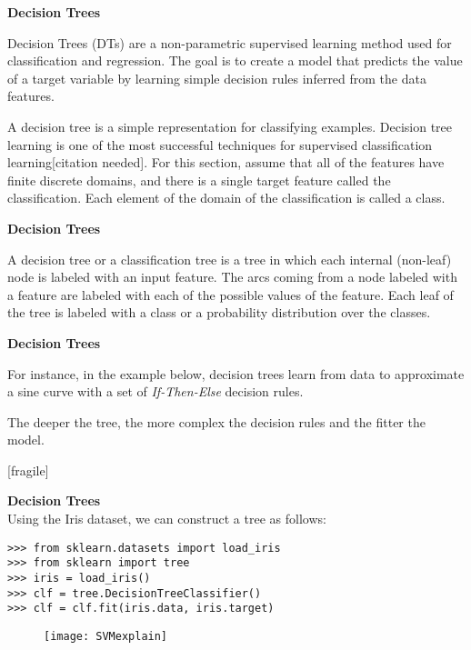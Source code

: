 \documentclass[MASTER.tex]{subfiles}
\begin{document}
 

 
  
\textbf{Decision Trees}
 
   Decision Trees (DTs) are a non-parametric supervised learning method used for classification and regression.  The goal is to create a model that predicts the value of a target variable by learning simple decision rules inferred from the data features.
 
 

 
 A decision tree is a simple representation for classifying examples. Decision tree learning is one of the most successful techniques for supervised classification learning[citation needed]. For this section, assume that all of the features have finite discrete domains, and there is a single target feature called the classification. Each element of the domain of the classification is called a class. 
 
 
  
 \textbf{Decision Trees}
  
   A decision tree or a classification tree is a tree in which each internal (non-leaf) node is labeled with an input feature. 
   The arcs coming from a node labeled with a feature are labeled with each of the possible values of the feature.
   Each leaf of the tree is labeled with a class or a probability distribution over the classes.

 
 
 
  
\textbf{Decision Trees}
 
\item For instance, in the example below, decision trees learn from data to approximate a sine curve with a set of \textit{If-Then-Else} decision rules. 
\item The deeper the tree, the more complex the decision rules and the fitter the model.
 

 
 [fragile]
  
\textbf{Decision Trees}\\

Using the Iris dataset, we can construct a tree as follows:
{
\normalsize
\begin{framed}
\begin{verbatim}
>>> from sklearn.datasets import load_iris
>>> from sklearn import tree
>>> iris = load_iris()
>>> clf = tree.DecisionTreeClassifier()
>>> clf = clf.fit(iris.data, iris.target)
\end{verbatim}
\end{framed}
}
 

 

\begin{figure}
\centering
\texttt{[image: SVMexplain]}
\end{figure}
 
 
\end{document}
